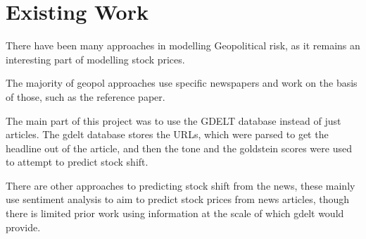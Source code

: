 \section{Existing Work}

There have been many approaches in modelling Geopolitical risk, as it remains an interesting part of modelling stock prices. 


The majority of geopol approaches use specific newspapers and work on the basis of those, such as the reference paper. 


The main part of this project was to use the GDELT database instead of just articles. The gdelt database stores the URLs, which were parsed to get the headline out of the article, and then the tone and the goldstein scores were used to attempt to predict stock shift. 


There are other approaches to predicting stock shift from the news, these mainly use sentiment analysis to aim to predict stock prices from news articles, though there is limited prior work using information at the scale of which gdelt would provide. 